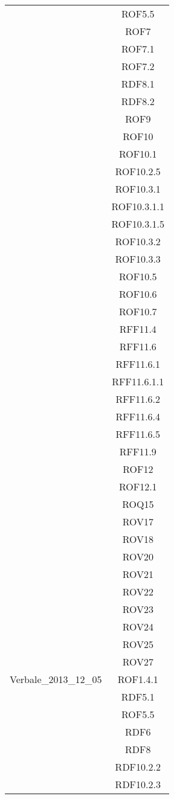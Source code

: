 \begin{longtable}{|c|c|}
& ROF5.5\\
& ROF7\\
& ROF7.1\\
& ROF7.2\\
& RDF8.1\\
& RDF8.2\\
& ROF9\\
& ROF10\\
& ROF10.1\\
& ROF10.2.5\\
& ROF10.3.1\\
& ROF10.3.1.1\\
& ROF10.3.1.5\\
& ROF10.3.2\\
& ROF10.3.3\\
& ROF10.5\\
& ROF10.6\\
& ROF10.7\\
& RFF11.4\\
& RFF11.6\\
& RFF11.6.1\\
& RFF11.6.1.1\\
& RFF11.6.2\\
& RFF11.6.4\\
& RFF11.6.5\\
& RFF11.9\\
& ROF12\\
& ROF12.1\\
& ROQ15\\
& ROV17\\
& ROV18\\
& ROV20\\
& ROV21\\
& ROV22\\
& ROV23\\
& ROV24\\
& ROV25\\
& ROV27\\


\midrule
Verbale\_2013\_12\_05
& ROF1.4.1\\
& RDF5.1\\
& ROF5.5\\
& RDF6\\
& RDF8\\
& RDF10.2.2\\
& RDF10.2.3\\


\end{longtable}
